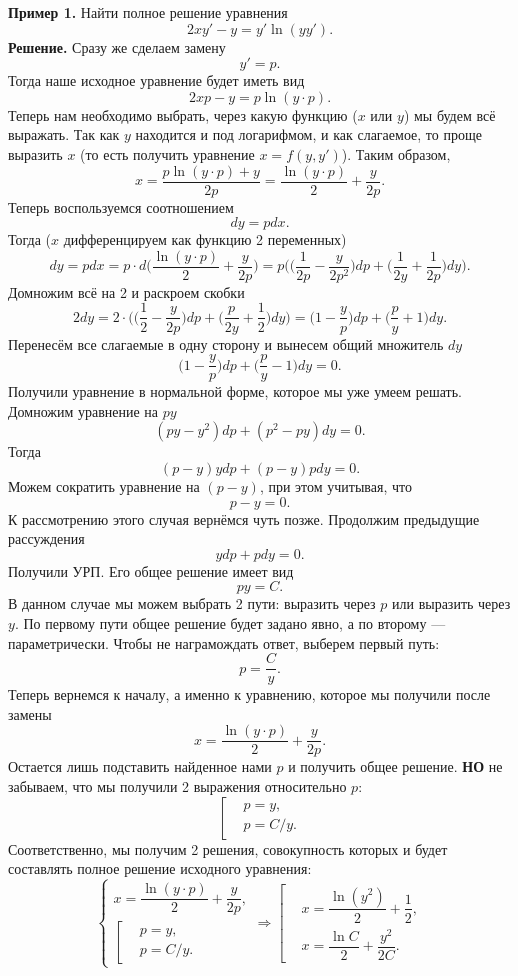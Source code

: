 \documentclass[a4paper, 12pt]{article}
\begin{document}
\textbf{Пример 1.} Найти полное решение уравнения $$2xy' - y = y'\ln (yy').$$
\textbf{Решение.} Сразу же сделаем замену $$y' = p.$$ Тогда наше исходное уравнение будет иметь вид $$2xp - y = p\ln(y\cdot p).$$
Теперь нам необходимо выбрать, через какую функцию ($x$ или $y$) мы будем всё выражать. Так как $y$ находится и под логарифмом, и как слагаемое, то проще выразить $x$ (то есть получить уравнение $x = f(y,y')$). Таким образом, $$x = \dfrac{p\ln(y\cdot p) + y}{2p} = \dfrac{\ln (y\cdot p)}{2} + \dfrac{y}{2p}.$$ Теперь воспользуемся соотношением $$dy = pdx.$$
Тогда ($x$ дифференцируем как функцию 2 переменных)
$$dy = pdx = p \cdot d\Big(\dfrac{\ln (y\cdot p)}{2} + \dfrac{y}{2p}\Big) = p\Big(\Big(\dfrac{1}{2p} - \dfrac{y}{2p^2}\Big)dp + \Big(\dfrac{1}{2y} + \dfrac{1}{2p}\Big)dy\Big).$$
Домножим всё на 2 и раскроем скобки $$2dy = 2\cdot \Big(\Big(\dfrac{1}{2} - \dfrac{y}{2p}\Big)dp + \Big(\dfrac{p}{2y} + \dfrac{1}{2}\Big)dy\Big) = \Big(1 - \dfrac{y}{p}\Big)dp + \Big(\dfrac{p}{y} + 1\Big)dy.$$
Перенесём все слагаемые в одну сторону и вынесем общий множитель $dy$
$$\Big(1 - \dfrac{y}{p}\Big)dp + \Big(\dfrac{p}{y} -1 \Big)dy = 0.$$ Получили уравнение в нормальной форме, которое мы уже умеем решать. Домножим уравнение на $py$ $$(py - y^2)dp + (p^2 - py)dy = 0.$$
Тогда $$(p-y)ydp + (p-y)pdy = 0.$$
Можем сократить уравнение на $(p-y)$, при этом учитывая, что $$p - y = 0.$$
К рассмотрению этого случая вернёмся чуть позже. Продолжим предыдущие рассуждения
$$ydp + pdy = 0.$$
Получили УРП. Его общее решение имеет вид $$py = C.$$ В данном случае мы можем выбрать 2 пути: выразить через $p$ или выразить через $y$. По первому пути общее решение будет задано явно, а по второму --- параметрически. Чтобы не награмождать ответ, выберем первый путь:
$$p = \dfrac{C}{y}.$$ 
Теперь вернемся к началу, а именно к уравнению, которое мы получили после замены $$x = \dfrac{\ln (y\cdot p)}{2} + \dfrac{y}{2p}.$$
Остается лишь подставить найденное нами $p$ и получить общее решение. \textbf{НО} не забываем, что мы получили 2 выражения относительно $p$:
$$\left[\begin{aligned}
	&p = y,\\
	&p = C/y.
\end{aligned}\right.$$
Соответственно, мы получим 2 решения, совокупность которых и будет составлять полное решение исходного уравнения:
$$\begin{cases}
	x = \dfrac{\ln (y\cdot p)}{2} + \dfrac{y}{2p},\\
	\left[\begin{aligned}
		&p = y,\\
		&p = C/y.
	\end{aligned}\right.
\end{cases}\Rightarrow \left[\begin{aligned}
&x = \dfrac{\ln (y^2)}{2} + \dfrac{1}{2},\\
&x = \dfrac{\ln C}{2} + \dfrac{y^2}{2C}.
\end{aligned}\right.$$
\end{document}
